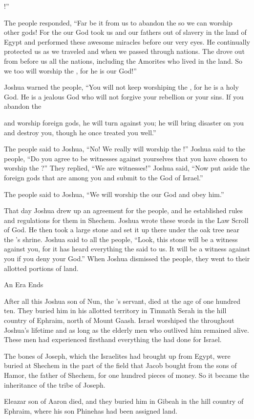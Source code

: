 {{}!”
\par }{\PP {}The people
responded,
“Far be it
from us to abandon
the {}
so we can worship
other
gods!
For
the {}
our God
took
us
and our fathers
out of slavery
in the land
of Egypt
and performed
these
awesome
miracles
before our very eyes.
He continually protected
us as
we traveled
and when we passed
through
nations.
The
{}
drove
out from before
us all
the nations,
including the Amorites
who lived
in the land.
So we
too
will worship
the {}, for
he is
our God!”
\par }{\PP {}Joshua
warned
the people,
“You will not
keep worshiping
the {}, for
he is
a holy
God.
He is
a jealous
God
who will not
forgive
your rebellion
or your sins.
If
you abandon
the

{}
and worship
foreign
gods,
he will turn
against you; he will bring disaster
on you and destroy
you, though he once treated
you well.”
\par }{\PP {}The people
said
to
Joshua,
“No! We really
will worship
the {}!”
Joshua
said
to
the people,
“Do you agree to be witnesses
against yourselves that
you
have chosen
to worship
the {}?” They replied,
“We are witnesses!”
Joshua said, “Now
put aside
the foreign
gods
that
are among
you and submit
to
the {}
God
of Israel.”
\par }{\PP {}The people
said
to
Joshua,
“We will worship
the {}
our God
and obey him.”
\par }{\PP {}That day
Joshua
drew up
an agreement
for the people,
and he established
rules
and regulations
for them in Shechem.
Joshua
wrote
these
words
in the Law
Scroll
of God.
He then took
a large
stone
and set
it up there
under
the oak
tree near the
{}’s
shrine.
Joshua
said
to
all
the people,
“Look,
this
stone
will be
a witness
against you, for
it
has heard
everything
the {}
said
to us.
It will be
a witness against
you if you
deny
your God.”
When
Joshua
dismissed
the people,
they went
to their allotted
portions of land.
\par }{\SH An Era Ends
\par }{\PP {}After
all this
Joshua
son
of Nun,
the
{}’s
servant,
died
at the age
of one hundred
ten.
They buried
him in his allotted
territory
in Timnath
Serah
in the hill country
of Ephraim,
north
of Mount
Gaash.
Israel
worshiped
the {}
throughout
Joshua’s
lifetime
and as long as
the elderly men
who
outlived
him
remained alive. These men had
experienced
firsthand
everything
the {}
had
done
for Israel.
\par }{\PP {}The
bones
of Joseph,
which
the Israelites
had brought up
from Egypt,
were buried
at Shechem
in the part
of the field
that
Jacob
bought
from the
sons
of Hamor,
the father
of Shechem,
for one hundred
pieces of money.
So it became
the inheritance
of the tribe
of Joseph.
\par }{\PP {}Eleazar
son
of Aaron
died,
and they buried
him in Gibeah
in the hill country
of Ephraim,
where his son
Phinehas
had
been assigned land.
\par }